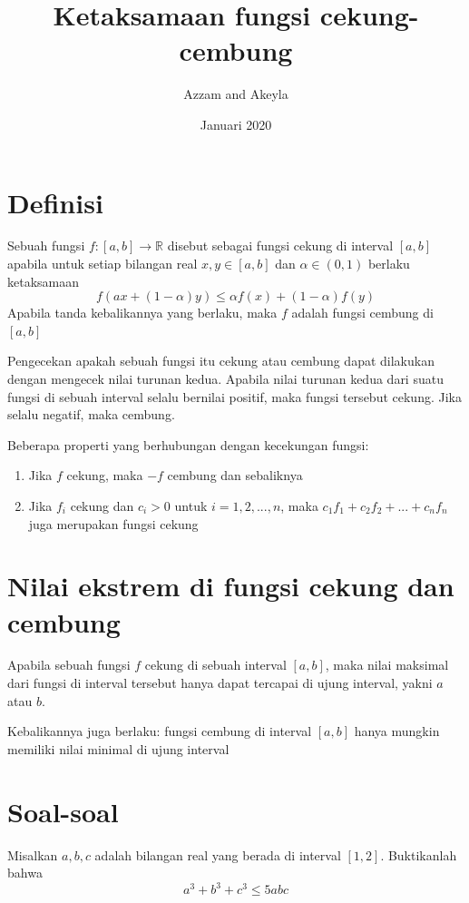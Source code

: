\documentclass[11pt]{scrartcl}
\title{Ketaksamaan fungsi cekung-cembung}
\author{Azzam and Akeyla}
\date{Januari 2020}
\begin{document}
\maketitle

\renewcommand*\contentsname{Daftar Isi}
\tableofcontents

\newpage

\section{Definisi}
\begin{definition}
    Sebuah fungsi $f: [a,b] \rightarrow \mathbb{R}$ disebut sebagai fungsi cekung di interval $[a, b]$ apabila untuk setiap bilangan real $x, y \in [a,b]$ dan $\alpha \in (0,1)$ berlaku ketaksamaan
    \[f(ax + (1 - \alpha)y) \leq \alpha f(x) + (1 - \alpha) f(y)\]
    Apabila tanda kebalikannya yang berlaku, maka $f$ adalah fungsi cembung di $[a,b]$
\end{definition}

Pengecekan apakah sebuah fungsi itu cekung atau cembung dapat dilakukan dengan mengecek nilai turunan kedua. Apabila nilai turunan kedua dari suatu fungsi di sebuah interval selalu bernilai positif, maka fungsi tersebut cekung. Jika selalu negatif, maka cembung.

Beberapa properti yang berhubungan dengan kecekungan fungsi:
\begin{enumerate}
    \item Jika $f$ cekung, maka $-f$ cembung dan sebaliknya
    \item Jika $f_i$ cekung dan $c_i > 0$ untuk $i = 1, 2, ..., n$, maka $c_1f_1 + c_2f_2 + ... + c_nf_n$ juga merupakan fungsi cekung
\end{enumerate}

\section{Nilai ekstrem di fungsi cekung dan cembung}
Apabila sebuah fungsi $f$ cekung di sebuah interval $[a,b]$, maka nilai maksimal dari fungsi di interval tersebut hanya dapat tercapai di ujung interval, yakni $a$ atau $b$.

Kebalikannya juga berlaku: fungsi cembung di interval $[a,b]$ hanya mungkin memiliki nilai minimal di ujung interval

\section{Soal-soal}
\begin{problem}
     Misalkan $a, b, c$ adalah bilangan real yang berada di interval $[1,2]$. Buktikanlah bahwa \[a^3 + b^3 + c^3 \leq 5abc\]
\end{problem}
\end{document}
